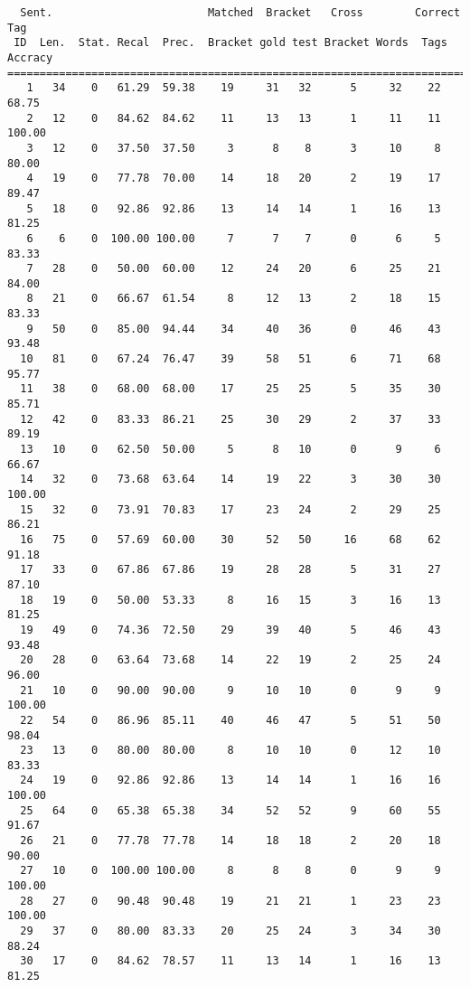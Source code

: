\scriptsize
\begin{verbatim}
  Sent.                        Matched  Bracket   Cross        Correct Tag
 ID  Len.  Stat. Recal  Prec.  Bracket gold test Bracket Words  Tags Accracy
============================================================================
   1   34    0   61.29  59.38    19     31   32      5     32    22    68.75
   2   12    0   84.62  84.62    11     13   13      1     11    11   100.00
   3   12    0   37.50  37.50     3      8    8      3     10     8    80.00
   4   19    0   77.78  70.00    14     18   20      2     19    17    89.47
   5   18    0   92.86  92.86    13     14   14      1     16    13    81.25
   6    6    0  100.00 100.00     7      7    7      0      6     5    83.33
   7   28    0   50.00  60.00    12     24   20      6     25    21    84.00
   8   21    0   66.67  61.54     8     12   13      2     18    15    83.33
   9   50    0   85.00  94.44    34     40   36      0     46    43    93.48
  10   81    0   67.24  76.47    39     58   51      6     71    68    95.77
  11   38    0   68.00  68.00    17     25   25      5     35    30    85.71
  12   42    0   83.33  86.21    25     30   29      2     37    33    89.19
  13   10    0   62.50  50.00     5      8   10      0      9     6    66.67
  14   32    0   73.68  63.64    14     19   22      3     30    30   100.00
  15   32    0   73.91  70.83    17     23   24      2     29    25    86.21
  16   75    0   57.69  60.00    30     52   50     16     68    62    91.18
  17   33    0   67.86  67.86    19     28   28      5     31    27    87.10
  18   19    0   50.00  53.33     8     16   15      3     16    13    81.25
  19   49    0   74.36  72.50    29     39   40      5     46    43    93.48
  20   28    0   63.64  73.68    14     22   19      2     25    24    96.00
  21   10    0   90.00  90.00     9     10   10      0      9     9   100.00
  22   54    0   86.96  85.11    40     46   47      5     51    50    98.04
  23   13    0   80.00  80.00     8     10   10      0     12    10    83.33
  24   19    0   92.86  92.86    13     14   14      1     16    16   100.00
  25   64    0   65.38  65.38    34     52   52      9     60    55    91.67
  26   21    0   77.78  77.78    14     18   18      2     20    18    90.00
  27   10    0  100.00 100.00     8      8    8      0      9     9   100.00
  28   27    0   90.48  90.48    19     21   21      1     23    23   100.00
  29   37    0   80.00  83.33    20     25   24      3     34    30    88.24
  30   17    0   84.62  78.57    11     13   14      1     16    13    81.25

\end{verbatim}
